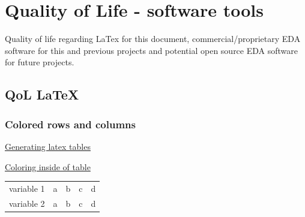 
\section{Quality of Life - software tools}

Quality of life regarding LaTex for this document, commercial/proprietary EDA software for this and previous projects and potential open source EDA software for future projects.


\subsection{QoL \LaTeX }


\subsubsection{Colored rows and columns}
\href{https://www.latex-tables.com/}{Generating latex tables}


\href{https://tex.stackexchange.com/questions/94799/how-do-i-color-table-columns}{Coloring inside of table}




%  


\begin{table}[ht!]
    \begin{tabular}{l | a | b | a | b}
        \hline
          &  &  &  &  \\
        \hline
        variable 1 & a & b & c & d \\
        variable 2 & a & b & c & d \\ \hline
    \end{tabular}
\end{table}

